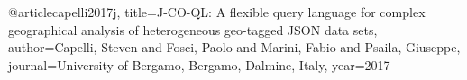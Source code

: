 @article{capelli2017j,
  title={J-CO-QL: A flexible query language for complex geographical analysis of heterogeneous geo-tagged JSON data sets},
  author={Capelli, Steven and Fosci, Paolo and Marini, Fabio and Psaila, Giuseppe},
  journal={University of Bergamo, Bergamo, Dalmine, Italy},
  year={2017}
}
